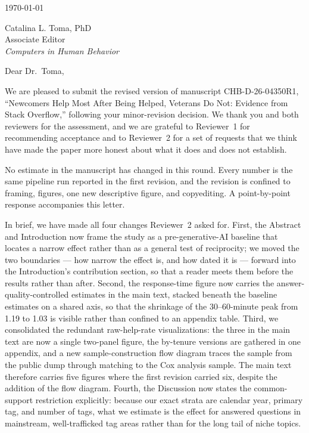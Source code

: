 \documentclass[12pt]{article}
\begin{document}
\noindent \today %

\vspace{1em}

\noindent Catalina L. Toma, PhD\\
Associate Editor\\
\textit{Computers in Human Behavior}

\vspace{1em}

\noindent Dear Dr.\ Toma,

\vspace{0.5em}

\noindent We are pleased to submit the revised version of manuscript CHB-D-26-04350R1, ``Newcomers Help Most After Being Helped, Veterans Do Not: Evidence from Stack Overflow,'' following your minor-revision decision. We thank you and both reviewers for the assessment, and we are grateful to Reviewer~1 for recommending acceptance and to Reviewer~2 for a set of requests that we think have made the paper more honest about what it does and does not establish.

\vspace{0.5em}

\noindent No estimate in the manuscript has changed in this round. Every number is the same pipeline run reported in the first revision, and the revision is confined to framing, figures, one new descriptive figure, and copyediting. A point-by-point response accompanies this letter.

\vspace{0.5em}

\noindent In brief, we have made all four changes Reviewer~2 asked for. First, the Abstract and Introduction now frame the study as a pre-generative-AI baseline that locates a narrow effect rather than as a general test of reciprocity; we moved the two boundaries --- how narrow the effect is, and how dated it is --- forward into the Introduction's contribution section, so that a reader meets them before the results rather than after. Second, the response-time figure now carries the answer-quality-controlled estimates in the main text, stacked beneath the baseline estimates on a shared axis, so that the shrinkage of the 30--60-minute peak from 1.19 to 1.03 is visible rather than confined to an appendix table. Third, we consolidated the redundant raw-help-rate visualizations: the three in the main text are now a single two-panel figure, the by-tenure versions are gathered in one appendix, and a new sample-construction flow diagram traces the sample from the public dump through matching to the Cox analysis sample. The main text therefore carries five figures where the first revision carried six, despite the addition of the flow diagram. Fourth, the Discussion now states the common-support restriction explicitly: because our exact strata are calendar year, primary tag, and number of tags, what we estimate is the effect for answered questions in mainstream, well-trafficked tag areas rather than for the long tail of niche topics.
\end{document}
